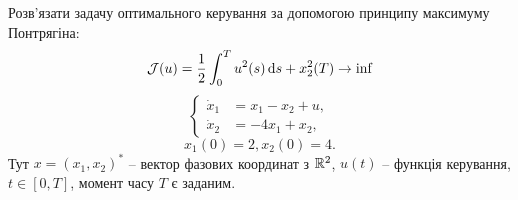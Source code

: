 \begin{problem}
    Розв'язати задачу оптимального керування за допомогою принципу максимуму Понтрягіна:
    \begin{equation*}
        \mathcal{J}(u) = \dfrac 12 \int_0^T u^2(s) \mathop{}\!\mathrm{d} s + x_2^2(T) \to \inf
    \end{equation*}
    \[ \left\{ \begin{aligned}
        \dot x_1 &= x_1 - x_2 + u, \\
        \dot x_2 &= - 4 x_1 + x_2,
    \end{aligned} \right. \]
    \begin{equation*}
        x_1(0) = 2, x_2(0) = 4.
    \end{equation*}
    Тут $x = (x_1, x_2)^*$ -- вектор фазових координат з $\mathbb{R}^2$, $u(t)$ -- функція керування, $t \in [0, T]$, момент часу $T$ є заданим.
\end{problem}


